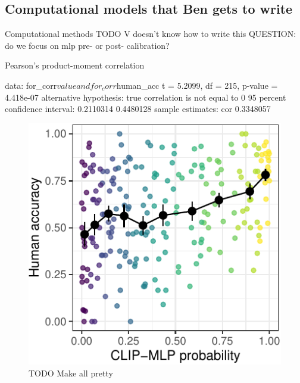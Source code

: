 \documentclass[10pt, letterpaper]{article}
\begin{document}
\subsection{Computational models that Ben gets to
write}\label{computational-models-that-ben-gets-to-write}

Computational methods TODO V doesn't know how to write this QUESTION: do
we focus on mlp pre- or post- calibration?

\begin{CodeChunk}
\begin{CodeOutput}

    Pearson's product-moment correlation

data:  for_corr$value and for_corr$human_acc
t = 5.2099, df = 215, p-value = 4.418e-07
alternative hypothesis: true correlation is not equal to 0
95 percent confidence interval:
 0.2110314 0.4480128
sample estimates:
      cor 
0.3348057 
\end{CodeOutput}
\end{CodeChunk}

\begin{CodeChunk}
\begin{figure}[t]

{\centering \includegraphics[width=1\linewidth]{figs/fig-calibration-1} 

}

\caption[TODO Make all pretty \label{FOOBAR}]{TODO Make all pretty \label{FOOBAR}}\label{fig:fig-calibration}
\end{figure}
\end{CodeChunk}
\end{document}
